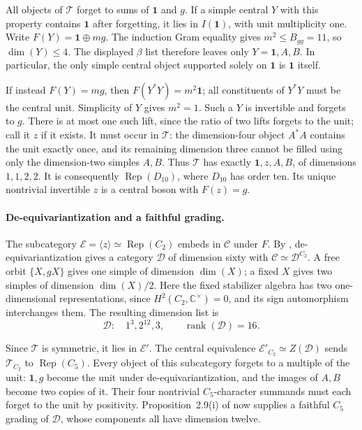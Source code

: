 All objects of $\mathcal T$ forget to sums of $\mathbf1$ and $g$.
If a simple central $Y$ with this property contains $\mathbf1$ after
forgetting, it lies in $I(\mathbf1)$, with unit multiplicity one. Write
$F(Y)=\mathbf1\oplus m g$. The induction Gram equality gives
$m^2\le B_{gg}=11$, so $\dim(Y)\le4$. The displayed $\beta$ list
therefore leaves only $Y=\mathbf1,A,B$. In particular, the only simple
central object supported solely on $\mathbf1$ is $\mathbf1$ itself.

If instead $F(Y)=m g$, then $F(Y^*Y)=m^2\mathbf1$; all constituents of
$Y^*Y$ must be the central unit. Simplicity of $Y$ gives $m^2=1$.
Such a $Y$ is invertible and forgets to $g$. There is at most one such
lift, since the ratio of two lifts forgets to the unit; call it $z$ if
it exists. It must occur in $\mathcal T$: the dimension-four object
$A^*A$ contains the unit exactly once, and its remaining dimension three
cannot be filled using only the dimension-two simples $A,B$.
Thus $\mathcal T$ has exactly $\mathbf1,z,A,B$, of dimensions $1,1,2,2$.
It is consequently $\operatorname{Rep}(D_{10})$, where $D_{10}$ has order
ten. Its unique nontrivial invertible $z$ is a central boson with $F(z)=g$.

\paragraph{De-equivariantization and a faithful grading.}
The subcategory $\mathcal E=\langle z\rangle\simeq\operatorname{Rep}(C_2)$
embeds in $\mathcal C$ under $F$. By
\cite[Proposition~2.10]{ENOSolvable}, de-equivariantization gives a
category $\mathcal D$ of dimension sixty with
$\mathcal C\simeq\mathcal D^{C_2}$.
A free orbit $\{X,gX\}$ gives one simple of dimension $\dim(X)$;
a fixed $X$ gives two simples of dimension $\dim(X)/2$.
Here the fixed stabilizer algebra has two one-dimensional representations,
since $H^2(C_2,\mathbb C^\times)=0$, and its sign automorphism interchanges
them. The resulting dimension list is
\[
 \mathcal D:\quad 1^3,2^{12},3,
 \qquad \operatorname{rank}(\mathcal D)=16.
\]

Since $\mathcal T$ is symmetric, it lies in $\mathcal E'$.
The central equivalence $\mathcal E'_{C_2}\simeq Z(\mathcal D)$ sends
$\mathcal T_{C_2}$ to $\operatorname{Rep}(C_5)$.
Every object of this subcategory forgets to a multiple of the unit:
$\mathbf1,g$ become the unit under de-equivariantization, and the images
of $A,B$ become two copies of it. Their four nontrivial $C_5$-character
summands must each forget to the unit by positivity.
Proposition~2.9(i) of \cite{ENOSolvable} now supplies a faithful $C_5$
grading of $\mathcal D$, whose components all have dimension twelve.

